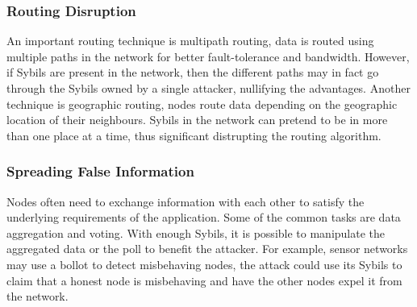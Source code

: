 \subsubsection{Routing Disruption}
An important routing technique is multipath routing, data is routed using
multiple paths in the network for better fault-tolerance and bandwidth. However,
if Sybils are present in the network, then the different paths may in fact go
through the Sybils owned by a single attacker, nullifying the advantages.
Another technique is geographic routing, nodes route data depending on the
geographic location of their neighbours. Sybils in the network can pretend to be
in more than one place at a time, thus significant distrupting the routing
algorithm\cite{karlof2003secure}.

\subsubsection{Spreading False Information}
Nodes often need to exchange information with each other to satisfy the
underlying requirements of the application. Some of the common tasks are data
aggregation and voting. With enough Sybils, it is possible to manipulate the
aggregated data or the poll to benefit the attacker. For example, sensor
networks may use a bollot to detect misbehaving nodes, the attack could use its
Sybils to claim that a honest node is misbehaving and have the other nodes expel
it from the network\cite{newsome2004sybil}.

